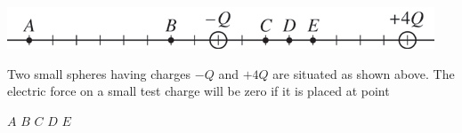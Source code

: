 \begin{center}
\includegraphics[scale=0.5]{images/img-004-007.png}
\end{center}

\begin{questions}\setcounter{question}{10}\question
Two small spheres having charges $-Q$ and $+4 Q$ are situated as shown above. The electric force on a small test charge will be zero if it is placed at point

\begin{oneparchoices}
\choice $A$
\choice $B$
\choice $C$
\choice $D$
\choice $E$
\end{oneparchoices}\end{questions}

